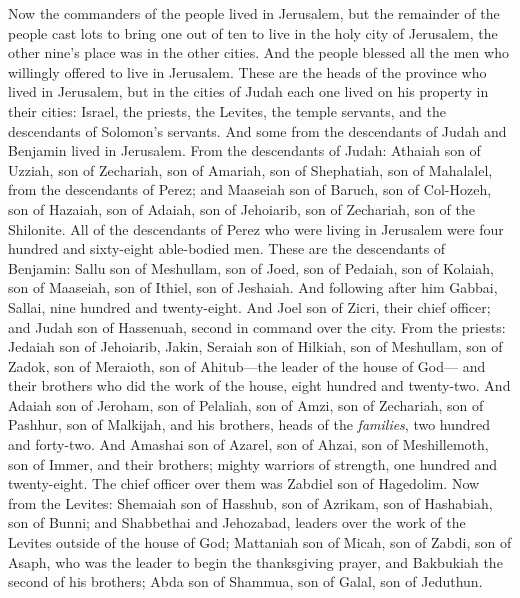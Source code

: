 \begin{biblechapter} %
 Now the commanders of the people lived in Jerusalem, but the remainder of the people cast lots to bring one out of ten to live in the holy city of Jerusalem, the other nine’s place was in the other cities.
\verse And the people blessed all the men who willingly offered to live in Jerusalem.
\verse These are the heads of the province who lived in Jerusalem, but in the cities of Judah each one lived on his property in their cities: Israel, the priests, the Levites, the temple servants, and the descendants of Solomon’s servants.
\verse And some from the descendants of Judah and Benjamin lived in Jerusalem. From the descendants of Judah: Athaiah son of Uzziah, son of Zechariah, son of Amariah, son of Shephatiah, son of Mahalalel, from the descendants of Perez;
\verse and Maaseiah son of Baruch, son of Col-Hozeh, son of Hazaiah, son of Adaiah, son of Jehoiarib, son of Zechariah, son of the Shilonite.
\verse All of the descendants of Perez who were living in Jerusalem were four hundred and sixty-eight able-bodied men.
\verse These are the descendants of Benjamin: Sallu son of Meshullam, son of Joed, son of Pedaiah, son of Kolaiah, son of Maaseiah, son of Ithiel, son of Jeshaiah.
\verse And following after him Gabbai, Sallai, nine hundred and twenty-eight.
\verse And Joel son of Zicri, their chief officer; and Judah son of Hassenuah, second in command over the city.
\verse From the priests: Jedaiah son of Jehoiarib, Jakin,
\verse Seraiah son of Hilkiah, son of Meshullam, son of Zadok, son of Meraioth, son of Ahitub—the leader of the house of God—
\verse and their brothers who did the work of the house, eight hundred and twenty-two. And Adaiah son of Jeroham, son of Pelaliah, son of Amzi, son of Zechariah, son of Pashhur, son of Malkijah,
\verse and his brothers, heads of the \textit{families}, two hundred and forty-two. And Amashai son of Azarel, son of Ahzai, son of Meshillemoth, son of Immer,
\verse and their brothers; mighty warriors of strength, one hundred and twenty-eight. The chief officer over them was Zabdiel son of Hagedolim.
\verse Now from the Levites: Shemaiah son of Hasshub, son of Azrikam, son of Hashabiah, son of Bunni;
\verse and Shabbethai and Jehozabad, leaders over the work of the Levites outside of the house of God;
\verse Mattaniah son of Micah, son of Zabdi, son of Asaph, who was the leader to begin the thanksgiving prayer, and Bakbukiah the second of his brothers; Abda son of Shammua, son of Galal, son of Jeduthun.

\end{biblechapter}
